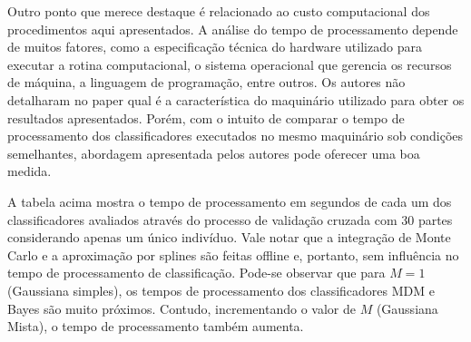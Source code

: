 \documentclass[a4paper,titlepage]{article}
\begin{document}
Outro ponto que merece destaque é relacionado ao custo computacional dos
procedimentos aqui apresentados. A análise do tempo de processamento depende
de muitos fatores, como a especificação técnica do hardware utilizado para
executar a rotina computacional, o sistema operacional que gerencia os recursos
de máquina, a linguagem de programação, entre outros. Os autores não detalharam
no paper qual é a característica do maquinário utilizado para obter os resultados
apresentados. Porém, com o intuito de comparar o tempo de processamento dos
classificadores executados no mesmo maquinário sob condições semelhantes,
abordagem apresentada pelos autores pode oferecer uma boa medida.

\begin{center}
  \vspace{1em}
  \vspace{1em}
\end{center}

A tabela acima mostra o tempo de processamento em segundos de cada um dos
classificadores avaliados através do processo de validação cruzada com 30
partes considerando apenas um único indivíduo. Vale notar que a integração
de Monte Carlo e a aproximação por splines são feitas offline e, portanto,
sem influência no tempo de processamento de classificação. Pode-se observar que
para $M=1$ (Gaussiana simples), os tempos de processamento dos classificadores
MDM e Bayes são muito próximos. Contudo, incrementando o valor de $M$
(Gaussiana Mista), o tempo de processamento também aumenta.

\begin{center}
  \vspace{1em}
  \vspace{1em}
\end{center}
\end{document}
